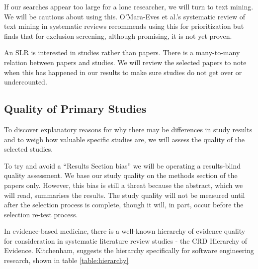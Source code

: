If our searches appear too large for a lone researcher, we will turn to text mining.
We will be cautious about using this.
O'Mara-Eves et al.'s systematic review of text mining in systematic reviews\cite{OMara-Eves_2015} recommends using this for prioritization but finds that for exclusion screening, although promising, it is not yet proven.

An SLR is interested in studies rather than papers.
There is a many-to-many relation between papers and studies.
We will review the selected papers to note when this has happened in our results to make sure studies do not get over or undercounted.

\subsection{Quality of Primary Studies}
To discover explanatory reasons for why there may be differences in study results and to weigh how valuable specific studies are, we will assess the quality of the selected studies.

To try and avoid a ``Results Section bias'' we will be operating a results-blind quality assessment.
We base our study quality on the methods section of the papers only.
However, this bias is still a threat because the abstract, which we will read, summarises the results.
The study quality will not be measured until after the selection process is complete, though it will, in part, occur before the selection re-test process.

In evidence-based medicine, there is a well-known hierarchy of evidence quality for consideration in systematic literature review studies - the CRD Hierarchy of Evidence\cite{Cochrane_2019}.
Kitchenham\cite{Kitchenham_2004_2}, suggests the hierarchy specifically for software engineering research, shown in table \ref{table:hierarchy}

